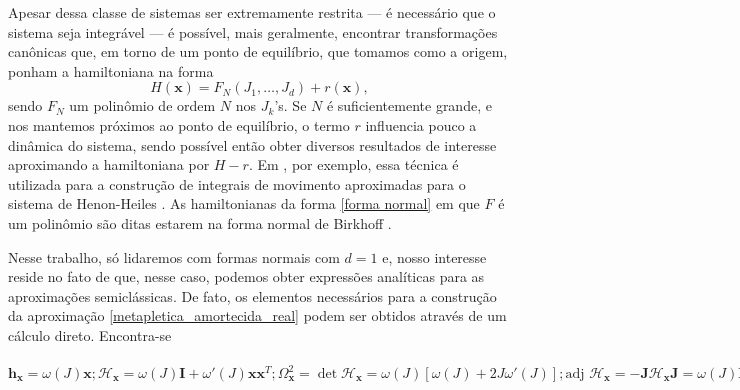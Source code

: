 \documentclass[
	12pt,
	oneside,			%
	a4paper,			%
	english,			%
	brazil				%
	]{abntex2}
\theoremstyle{definition}
\begin{document}
Apesar dessa classe de sistemas ser extremamente restrita — é necessário que o sistema seja integrável — é possível, mais geralmente, encontrar transformações canônicas que, em torno de um ponto de equilíbrio, que tomamos como a origem, ponham a hamiltoniana na forma
\begin{equation}
    H(\mathbf{x}) = F_N(J_1,\ldots,J_d) + r(\mathbf{x}),
\end{equation}
sendo $F_N$ um polinômio de ordem $N$ nos $J_k$'s. Se $N$ é suficientemente grande, e nos mantemos próximos ao ponto de equilíbrio, o termo $r$ influencia pouco a dinâmica do sistema, sendo possível então obter diversos resultados de interesse aproximando a hamiltoniana por $H -r$. Em \cite{gustavson1966on}, por exemplo, essa técnica é utilizada para a construção de integrais de movimento aproximadas para o sistema de Henon-Heiles \cite{henon1964applicability}. As hamiltonianas da forma \eqref{forma normal} em que $F$ é um polinômio são ditas estarem na forma normal de Birkhoff \cite{arnol2013dynamical,de1990hamiltonian}.

Nesse trabalho, só lidaremos com formas normais com $d=1$ e, nosso interesse reside no fato de que, nesse caso, podemos obter expressões analíticas para as aproximações semiclássicas. De fato, os elementos necessários para a construção da aproximação \eqref{metapletica_amortecida_real} podem ser obtidos através de um cálculo direto. Encontra-se
\begin{subequations}
\label{formulas metapleticas}
\begin{equation}
    \mathbf{h}_\mathbf{x} = \omega(J) \mathbf{x};
\end{equation}
\begin{equation}
    \boldsymbol{\mathcal{H}}_\mathbf{x} = \omega(J) \mathbf{I} + \omega'(J)\mathbf{x} \mathbf{x}^T;
\end{equation}
\begin{equation}
    \Omega_\mathbf{x}^2 = \det \boldsymbol{\mathcal{H}}_\mathbf{x} = \omega(J)\left[\omega(J) + 2J \omega'(J)\right];
\end{equation}
\begin{equation}
    \text{adj } \boldsymbol{\mathcal{H}}_\mathbf{x} = -\mathbf{J} \boldsymbol{\mathcal{H}}_\mathbf{x} \mathbf{J} = \omega(J) \mathbf{I} - \omega'(J)\mathbf{J} \mathbf{x} \mathbf{x}^T\mathbf{J};
\end{equation}
\begin{equation}
    \begin{aligned}
        \left(\text{adj } \boldsymbol{\mathcal{H}}_\mathbf{x} \right)\mathbf{h}_\mathbf{x} \cdot \mathbf{h}_\mathbf{x} &= \omega^2(J)\left[\omega(J) \mathbf{x}^2 - \omega'(J)\mathbf{x}^T \mathbf{J} \mathbf{x} \mathbf{x}^T\mathbf{J}\mathbf{x}\right] \\
        &= \omega^2(J)\left[2\omega(J) J - \omega'(J)\left( \mathbf{x} \wedge \mathbf{x}\right)^2\right] = 2 J \omega^3(J)
    \end{aligned}
\end{equation}
\end{subequations}
\end{document}
